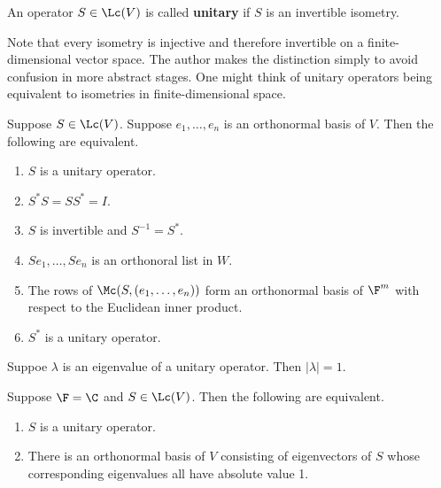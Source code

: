 \documentclass{extarticle}
\begin{document}
\begin{definition}
    An operator \(S \in \Lc(V)\) is called \textbf{unitary} if \(S\) is an invertible isometry.
\end{definition}


\begin{remark}
    Note that every isometry is injective and therefore invertible on a finite-dimensional vector
    space. The author makes the distinction simply to avoid confusion in more abstract stages. One
    might think of unitary operators being equivalent to isometries in finite-dimensional space.
\end{remark}

\begin{thm}
    Suppose \(S \in \Lc(V)\). Suppose \(e_1, \ldots, e_n\) is an orthonormal basis of \(V\).
    Then the following are equivalent.
    \begin{enumerate}[label=(\alph*)]
        \item \(S\) is a unitary operator.
        \item \(S^* S = SS^* =  I\).
        \item \(S\) is invertible and \(S^{-1} =S^*\).
        \item \(Se_1, \ldots, Se_n\) is an orthonoral list in \(W\).
        \item The rows of \(\Mc(S, (e_1, \ldots, e_n))\) form an orthonormal
        basis of \(\F^m\) with respect to the Euclidean inner product.
        \item \(S^*\) is a unitary operator.
    \end{enumerate}
\end{thm}

\begin{corollary}
    Suppoe \(\lambda\) is an eigenvalue of a unitary operator. Then
    \(|\lambda| = 1\).
\end{corollary}

\begin{corollary}
    Suppose \(\F = \C\) and \(S \in \Lc(V)\). Then the following are equivalent.
    \begin{enumerate}[label=(\alph*)]
        \item \(S\) is a unitary operator.
        \item There is an orthonormal basis of \(V\) consisting of eigenvectors of \(S\) whose
        corresponding eigenvalues all have absolute value 1.
    \end{enumerate}
\end{corollary}
\end{document}
